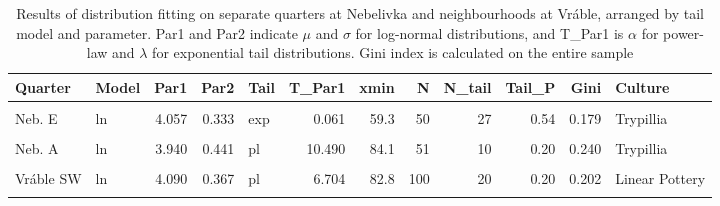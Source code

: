 \documentclass[
  12pt,
]{book}
\begin{document}
\begin{landscape}\begin{table}

\caption{\label{tab:06-quart-tab}Results of distribution fitting on separate quarters at Nebelivka and neighbourhoods at Vráble, arranged by tail model and parameter. Par1 and Par2 indicate \(\mu\) and \(\sigma\) for log-normal distributions, and T\_Par1 is \(\alpha\) for power-law and \(\lambda\) for exponential tail distributions. Gini index is calculated on the entire sample}
\centering
\begin{tabular}[t]{llrrlrrrrrrl}
\toprule
Quarter & Model & Par1 & Par2 & Tail & T\_Par1 & xmin & N & N\_tail & Tail\_P & Gini & Culture\\
\midrule
\cellcolor{gray!6}{Neb. N} & \cellcolor{gray!6}{ln} & \cellcolor{gray!6}{3.830} & \cellcolor{gray!6}{0.408} & \cellcolor{gray!6}{exp} & \cellcolor{gray!6}{0.063} & \cellcolor{gray!6}{55.7} & \cellcolor{gray!6}{111} & \cellcolor{gray!6}{41} & \cellcolor{gray!6}{0.37} & \cellcolor{gray!6}{0.224} & \cellcolor{gray!6}{Trypillia}\\
Neb. E & ln & 4.057 & 0.333 & exp & 0.061 & 59.3 & 50 & 27 & 0.54 & 0.179 & Trypillia\\
\cellcolor{gray!6}{Vráble SE} & \cellcolor{gray!6}{ln} & \cellcolor{gray!6}{4.296} & \cellcolor{gray!6}{0.424} & \cellcolor{gray!6}{exp} & \cellcolor{gray!6}{0.034} & \cellcolor{gray!6}{84.4} & \cellcolor{gray!6}{89} & \cellcolor{gray!6}{37} & \cellcolor{gray!6}{0.42} & \cellcolor{gray!6}{0.236} & \cellcolor{gray!6}{Linear Pottery}\\
Neb. A & ln & 3.940 & 0.441 & pl & 10.490 & 84.1 & 51 & 10 & 0.20 & 0.240 & Trypillia\\
\cellcolor{gray!6}{Neb. G} & \cellcolor{gray!6}{ln} & \cellcolor{gray!6}{4.137} & \cellcolor{gray!6}{0.295} & \cellcolor{gray!6}{pl} & \cellcolor{gray!6}{6.763} & \cellcolor{gray!6}{67.5} & \cellcolor{gray!6}{141} & \cellcolor{gray!6}{60} & \cellcolor{gray!6}{0.43} & \cellcolor{gray!6}{0.160} & \cellcolor{gray!6}{Trypillia}\\
\addlinespace
Vráble SW & ln & 4.090 & 0.367 & pl & 6.704 & 82.8 & 100 & 20 & 0.20 & 0.202 & Linear Pottery\\
\cellcolor{gray!6}{Neb. D} & \cellcolor{gray!6}{ln} & \cellcolor{gray!6}{4.085} & \cellcolor{gray!6}{0.361} & \cellcolor{gray!6}{pl} & \cellcolor{gray!6}{5.684} & \cellcolor{gray!6}{68.5} & \cellcolor{gray!6}{104} & \cellcolor{gray!6}{38} & \cellcolor{gray!6}{0.37} & \cellcolor{gray!6}{0.196} & \cellcolor{gray!6}{Trypillia}\\

\end{tabular}
\end{table}
\end{landscape}
\end{document}
